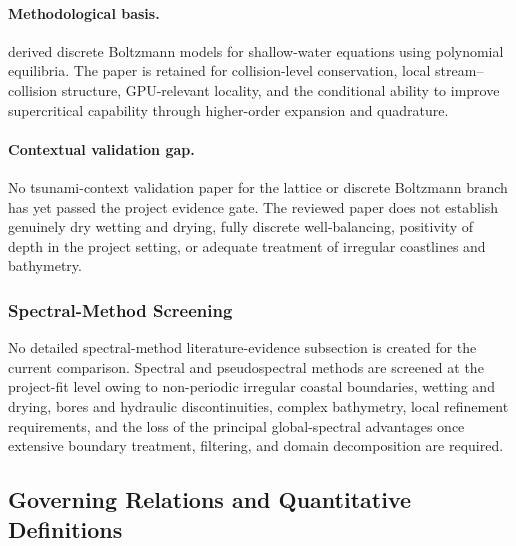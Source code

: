 \paragraph{Methodological basis.}
\textcite{meng2018discreteboltzmann} derived discrete Boltzmann models
for shallow-water equations using polynomial equilibria. The paper is
retained for collision-level conservation, local stream--collision
structure, GPU-relevant locality, and the conditional ability to improve
supercritical capability through higher-order expansion and quadrature.

\paragraph{Contextual validation gap.}
No tsunami-context validation paper for the lattice or discrete
Boltzmann branch has yet passed the project evidence gate. The reviewed
paper does not establish genuinely dry wetting and drying, fully
discrete well-balancing, positivity of depth in the project setting, or
adequate treatment of irregular coastlines and bathymetry.

\subsubsection{Spectral-Method Screening}
\label{sec:res-num-frm-evidence-spectral-screening}

No detailed spectral-method literature-evidence subsection is created
for the current comparison. Spectral and pseudospectral methods are
screened at the project-fit level owing to non-periodic irregular
coastal boundaries, wetting and drying, bores and hydraulic
discontinuities, complex bathymetry, local refinement requirements, and
the loss of the principal global-spectral advantages once extensive
boundary treatment, filtering, and domain decomposition are required.

\subsection{Governing Relations and Quantitative Definitions}
\label{sec:res-num-frm-governing-relations}

%


